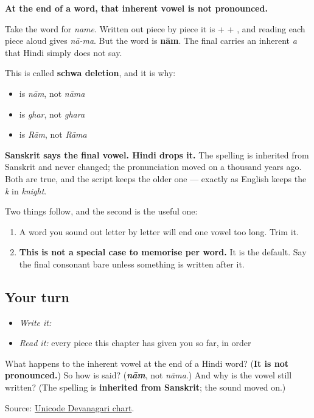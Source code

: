 \textbf{At the end of a word, that inherent vowel is not pronounced.}

Take the word for \emph{name}. Written out piece by piece it is \textbf{} + \textbf{} + \textbf{}, and reading each piece aloud gives \emph{nā-ma}. But the word is \textbf{nām}. The final \textbf{} carries an inherent \emph{a} that Hindi simply does not say.

This is called \textbf{schwa deletion}, and it is why:

\begin{itemize}
\raggedright
  \item \textbf{} is \emph{nām}, not \emph{nāma}
  \item \textbf{} is \emph{ghar}, not \emph{ghara}
  \item \textbf{} is \emph{Rām}, not \emph{Rāma}
\end{itemize}

\textbf{Sanskrit says the final vowel. Hindi drops it.} The spelling is inherited from Sanskrit and never changed; the pronunciation moved on a thousand years ago. Both are true, and the script keeps the older one — exactly as English keeps the \emph{k} in \emph{knight}.

Two things follow, and the second is the useful one:

\begin{enumerate}
\raggedright
  \item A word you sound out letter by letter will end one vowel too long. Trim it.
  \item \textbf{This is not a special case to memorise per word.} It is the default. Say the final consonant bare unless something is written after it.
\end{enumerate}

\subsection*{Your turn}
\begin{itemize}
\raggedright
  \item \emph{Write it:} 
  \item \emph{Read it:} every piece this chapter has given you so far, in order
\end{itemize}

\begin{tcolorbox}[breakable,colback=teal!4,colframe=teal!35!black,title={Before you move on}]
What happens to the inherent vowel at the end of a Hindi word? (\textbf{It is not pronounced.}) So how is \textbf{} said? (\emph{\textbf{nām}}, not \emph{nāma}.) And why is the vowel still written? (The spelling is \textbf{inherited from Sanskrit}; the sound moved on.)

Source: \href{https://www.unicode.org/charts/PDF/U0900.pdf}{Unicode Devanagari chart}.
\end{tcolorbox}
